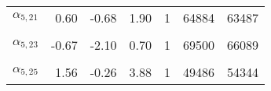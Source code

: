 \begin{longtable}[t]{lrrrrrr}
$\alpha_{5, 21}$ & 0.60 & -0.68 & 1.90 & 1 & 64884 & 63487\\
\cellcolor{gray!6}{$\alpha_{5, 22}$} & \cellcolor{gray!6}{1.68} & \cellcolor{gray!6}{0.27} & \cellcolor{gray!6}{3.27} & \cellcolor{gray!6}{1} & \cellcolor{gray!6}{64016} & \cellcolor{gray!6}{59300}\\
$\alpha_{5, 23}$ & -0.67 & -2.10 & 0.70 & 1 & 69500 & 66089\\
\cellcolor{gray!6}{$\alpha_{5, 24}$} & \cellcolor{gray!6}{0.05} & \cellcolor{gray!6}{-1.36} & \cellcolor{gray!6}{1.52} & \cellcolor{gray!6}{1} & \cellcolor{gray!6}{59708} & \cellcolor{gray!6}{62276}\\
$\alpha_{5, 25}$ & 1.56 & -0.26 & 3.88 & 1 & 49486 & 54344\\*
\end{longtable}